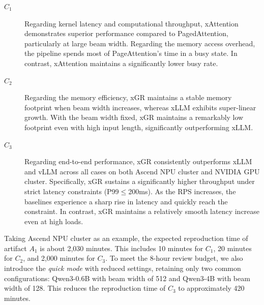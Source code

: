 \documentclass[conference]{IEEEtran}
\begin{document}
\begin{description}

\item[$C_1$] Regarding kernel latency and computational throughput, xAttention demonstrates superior performance compared to PagedAttention, particularly at large beam width. Regarding the memory access overhead, the pipeline spends most of PageAttention's time in a busy state. In contrast, xAttention maintains a significantly lower busy rate.

\item[$C_2$] Regarding the memory efficiency, xGR maintains a stable memory footprint when beam width increases, whereas xLLM exhibits super-linear growth. With the beam width fixed, xGR maintains a remarkably low footprint even with high input length, significantly outperforming xLLM.

\item[$C_3$] Regarding end-to-end performance, xGR consistently outperforms xLLM and vLLM across all cases on both Ascend NPU cluster and NVIDIA GPU cluster. Specifically, xGR sustains a significantly higher throughput under strict latency constraints (P99$\leq$200ms). As the RPS increases, the baselines experience a sharp rise in latency and quickly reach the constraint. In contrast, xGR maintains a relatively smooth latency increase even at high loads. 


\end{description}

%


\arttime


Taking  Ascend NPU cluster as an example, the expected reproduction time of artifact $A_1$ is about 2,030 minutes. This includes 10 minutes for $C_1$, 20 minutes for $C_2$, and 2,000 minutes for $C_3$. To meet the 8-hour review budget, we also introduce the \textit{quick mode} with reduced settings, retaining only two common configurations: Qwen3-0.6B with beam width of 512 and Qwen3-4B with beam width of 128. This reduces the reproduction time of $C_3$ to approximately 420 minutes.
\end{document}

